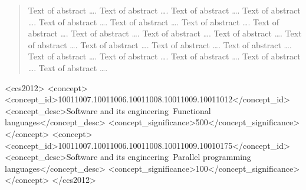 \documentclass[sigplan,review]{acmart}\settopmatter{printfolios=true}
\begin{document}
 \begin{abstract}
 Text of abstract \ldots. Text of abstract \ldots. Text of abstract \ldots. Text of abstract 
 \ldots.
 Text of abstract \ldots. Text of abstract \ldots. Text of abstract \ldots. Text of abstract 
 \ldots.
 Text of abstract \ldots. Text of abstract \ldots. Text of abstract \ldots. Text of abstract 
 \ldots.
 Text of abstract \ldots. Text of abstract \ldots. Text of abstract \ldots. Text of abstract 
 \ldots.
 Text of abstract \ldots. Text of abstract \ldots. Text of abstract \ldots. Text of abstract 
 \ldots.
 \end{abstract}


\begin{CCSXML}
<ccs2012>
<concept>
<concept_id>10011007.10011006.10011008.10011009.10011012</concept_id>
<concept_desc>Software and its engineering~Functional languages</concept_desc>
<concept_significance>500</concept_significance>
</concept>
<concept>
<concept_id>10011007.10011006.10011008.10011009.10010175</concept_id>
<concept_desc>Software and its engineering~Parallel programming languages</concept_desc>
<concept_significance>100</concept_significance>
</concept>
</ccs2012>
\end{CCSXML}




\maketitle
\end{document}
